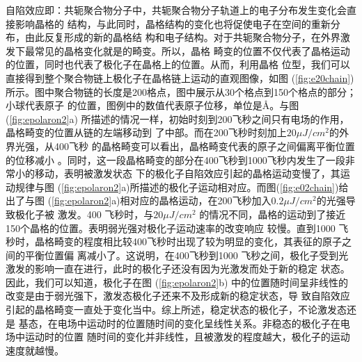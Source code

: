 \documentclass[12pt,]{report}
\begin{document}
自陷效应即：共轭聚合物分子中，共轭聚合物分子轨道上的电子分布发生变化会直接影响晶格的
结构，与此同时，晶格结构的变化也将促使电子在空间的重新分布，由此反复形成的新的晶格结
构和电子结构。对于共轭聚合物分子，在外界激发下最常见的晶格变化就是的畸变。所以，晶格
畸变的位置不仅代表了晶格运动的位置，同时也代表了极化子在晶格上的位置。从而，利用晶格
位型，我们可以直接得到整个聚合物链上极化子在晶格链上运动的直观图像，如图
(\ref{fig:e20chain})
所示。图中聚合物链的长度是200格点，图中展示从30个格点到150个格点的部分；小球代表原子
的位置，图例中的数值代表原子位移，单位是\AA。与图 (\ref{fig:epolaron2}a)
所描述的情况一样，初始时刻到200飞秒之间只有电场的作用，晶格畸变的位置从链的左端移动到
了中部。而在200飞秒时刻加上\(20\mu J/cm^2\)的外界光强，从400飞秒
的晶格畸变可以看出，晶格畸变代表的原子之间偏离平衡位置的位移减小
。同时，这一段晶格畸变的部分在400飞秒到1000飞秒内发生了一段非常小的移动，表明被激发状态
下的极化子自陷效应引起的晶格运动变慢了，其运动规律与图
(\ref{fig:epolaron2}a)所描述的极化子运动相对应。而图(\ref{fig:e02chain})给出了与图
(\ref{fig:epolaron2}a)相对应的晶格运动，在200飞秒加入\(0.2\mu J/cm^2\)的光强导致极化子被
激发。400 飞秒时，与\(20\mu J/cm^2\)
的情况不同，晶格的运动到了接近150个晶格的位置。表明弱光强对极化子运动速率的改变响应
较慢。直到1000
飞秒时，晶格畸变的程度相比较400飞秒时出现了较为明显的变化，其表征的原子之间的平衡位置偏
离减小了。这说明，在400飞秒到1000
飞秒之间，极化子受到光激发的影响一直在进行，此时的极化子还没有因为光激发而处于新的稳定
状态。因此，我们可以知道，极化子在图 (\ref{fig:epolaron2}b)
中的位置随时间呈非线性的改变是由于弱光强下，激发态极化子还来不及形成新的稳定状态，导
致自陷效应引起的晶格畸变一直处于变化当中。综上所述，稳定状态的极化子，不论激发态还是
基态，在电场中运动时的位置随时间的变化呈线性关系。非稳态的极化子在电场中运动时的位置
随时间的变化并非线性，且被激发的程度越大，极化子的运动速度就越慢。
\end{document}
